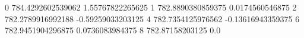 0 784.4292602539062 1.55767822265625
1 782.8890380859375 0.0174560546875
2 782.2789916992188 -0.59259033203125
4 782.7354125976562 -0.13616943359375
6 782.9451904296875 0.0736083984375
8 782.87158203125 0.0
